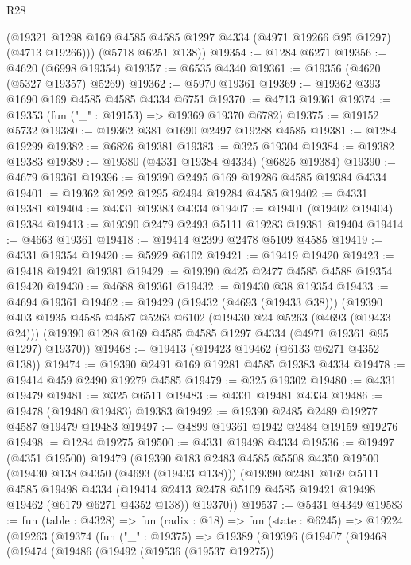 \begin{lexlean}{R28}
\begin{coremodule}
        (@19321 @1298 @169 @4585 @4585 @1297 @4334 (@4971 @19266 @95 @1297) (@4713 @19266)))
      (@5718 @6251 @138))
@19354 := @1284 @6271
@19356 := @4620 (@6998 @19354)
@19357 := @6535 @4340
@19361 := @19356 (@4620 (@5327 @19357) @5269)
@19362 := @5970 @19361
@19369 := @19362 @393 @1690 @169 @4585 @4585 @4334 @6751
@19370 := @4713 @19361
@19374 := @19353 (fun ("_" : @19153) => @19369 @19370 @6782)
@19375 := @19152 @5732
@19380 := @19362 @381 @1690 @2497 @19288 @4585
@19381 := @1284 @19299
@19382 := @6826 @19381
@19383 := @325 @19304
@19384 := @19382 @19383
@19389 := @19380 (@4331 @19384 @4334) (@6825 @19384)
@19390 := @4679 @19361
@19396 := @19390 @2495 @169 @19286 @4585 @19384 @4334
@19401 := @19362 @1292 @1295 @2494 @19284 @4585
@19402 := @4331 @19381
@19404 := @4331 @19383 @4334
@19407 := @19401 (@19402 @19404) @19384
@19413 := @19390 @2479 @2493 @5111 @19283 @19381 @19404
@19414 := @4663 @19361
@19418 := @19414 @2399 @2478 @5109 @4585
@19419 := @4331 @19354
@19420 := @5929 @6102
@19421 := @19419 @19420
@19423 := @19418 @19421 @19381
@19429 := @19390 @425 @2477 @4585 @4588 @19354 @19420
@19430 := @4688 @19361
@19432 := @19430 @38 @19354
@19433 := @4694 @19361
@19462 := @19429
    (@19432 (@4693 (@19433 @38)))
    (@19390
      @403
      @1935
      @4585
      @4587
      @5263
      @6102
      (@19430 @24 @5263 (@4693 (@19433 @24)))
      (@19390 @1298 @169 @4585 @4585 @1297 @4334 (@4971 @19361 @95 @1297) @19370))
@19468 := @19413 (@19423 @19462 (@6133 @6271 @4352 @138))
@19474 := @19390 @2491 @169 @19281 @4585 @19383 @4334
@19478 := @19414 @459 @2490 @19279 @4585
@19479 := @325 @19302
@19480 := @4331 @19479
@19481 := @325 @6511
@19483 := @4331 @19481 @4334
@19486 := @19478 (@19480 @19483) @19383
@19492 := @19390 @2485 @2489 @19277 @4587 @19479 @19483
@19497 := @4899 @19361 @1942 @2484 @19159 @19276
@19498 := @1284 @19275
@19500 := @4331 @19498 @4334
@19536 := @19497
    (@4351 @19500)
    @19479
    (@19390
      @183
      @2483
      @4585
      @5508
      @4350
      @19500
      (@19430 @138 @4350 (@4693 (@19433 @138)))
      (@19390
        @2481
        @169
        @5111
        @4585
        @19498
        @4334
        (@19414 @2413 @2478 @5109 @4585 @19421 @19498 @19462 (@6179 @6271 @4352 @138))
        @19370))
@19537 := @5431 @4349
@19583 := fun (table : @4328) =>
  fun (radix : @18) =>
  fun (state : @6245) =>
  @19224
    (@19263
      (@19374
        (fun ("_" : @19375) =>
        @19389
          (@19396
            (@19407
              (@19468
                (@19474
                  (@19486
                    (@19492
                      (@19536 (@19537 @19275))

\end{coremodule}
\end{lexlean}
